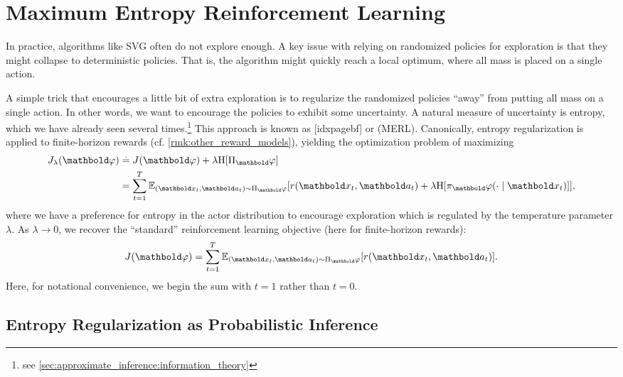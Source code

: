 \section{Maximum Entropy Reinforcement Learning}\label{sec:mfarl:actor_critic_methods:entropy_regularization}

In practice, algorithms like SVG often do not explore enough.
A key issue with relying on randomized policies for exploration is that they might collapse to deterministic policies.
That is, the algorithm might quickly reach a local optimum, where all mass is placed on a single action.

A simple trick that encourages a little bit of extra exploration is to regularize the randomized policies ``away'' from putting all mass on a single action.
In other words, we want to encourage the policies to exhibit some uncertainty.
A natural measure of uncertainty is entropy, which we have already seen several times.\footnote{see \cref{sec:approximate_inference:information_theory}}
This approach is known as [idxpagebf] or  (MERL).
Canonically, entropy regularization is applied to finite-horizon rewards (cf. \cref{rmk:other_reward_models}), yielding the optimization problem of maximizing \begin{align}
  \j{\vvarphi}[\lambda] &\defeq \j{\vvarphi} + \lambda \H{\altpi_\vvarphi} \\
  &= \sum_{t=1}^{T} \E[(\vx_t,\va_t) \sim \altpi_\vvarphi]{r(\vx_t, \va_t) + \lambda \H{\pi_\vvarphi(\cdot \mid \vx_t)}}, \label{eq:entropy_reg_rl}
\end{align} where we have a preference for entropy in the actor distribution to encourage exploration which is regulated by the temperature parameter $\lambda$.
As $\lambda \to 0$, we recover the ``standard'' reinforcement learning objective (here for finite-horizon rewards): \begin{align}
  \j{\vvarphi} = \sum_{t=1}^{T} \E[(\vx_t,\va_t) \sim \altpi_\vvarphi]{r(\vx_t, \va_t)}.
\end{align}
Here, for notational convenience, we begin the sum with $t=1$ rather than $t=0$.

\subsection{Entropy Regularization as Probabilistic Inference}\label{sec:mfarl:entropy_regularization_as_probabilistic_inference}

